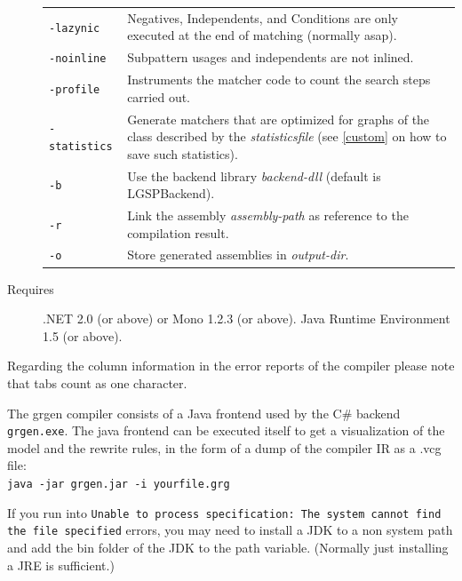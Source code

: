 \begin{description}
\begin{tabularx}{\linewidth}{lX}
      \texttt{-lazynic} & Negatives, Independents, and Conditions are only executed at the end of matching (normally asap).\\
      \texttt{-noinline} & Subpattern usages and independents are not inlined.\\
      \texttt{-profile} & Instruments the matcher code to count the search steps carried out.\\
      \texttt{-statistics} & Generate matchers that are optimized for graphs of the class described by the \emph{statisticsfile} (see \ref{custom} on how to save such statistics).\\
      \texttt{-b} & Use the backend library \emph{backend-dll} (default is LGSPBackend).\\
      \texttt{-r} & Link the assembly \emph{assembly-path} as reference to the compilation result.\\
      \texttt{-o} & Store generated assemblies in \emph{output-dir}.
    \end{tabularx}
  \item[Requires] .NET 2.0 (or above) or Mono 1.2.3 (or above). Java Runtime Environment 1.5 (or above).
\end{description}

\begin{note}
Regarding the column information in the error reports of the compiler please note that tabs count as one character.
\end{note}

\begin{note}\label{note:modelruledump}
The grgen compiler consists of a Java frontend used by the C\# backend \texttt{grgen.exe}.
The java frontend can be executed itself to get a visualization of the model and the rewrite rules,
in the form of a dump of the compiler IR as a .vcg file:\\
\texttt{java -jar grgen.jar -i yourfile.grg}
\end{note}

\begin{note}
If you run into \texttt{Unable to process specification: The system cannot find the file specified} errors, 
you may need to install a JDK to a non system path and add the bin folder of the JDK to the path variable.
(Normally just installing a JRE is sufficient.)
\end{note}


